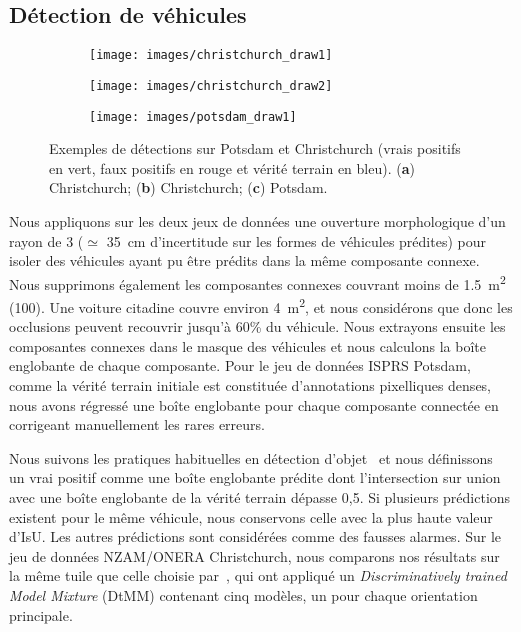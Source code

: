 \subsection{Détection de véhicules}
\begin{figure}[t]
\centering
	\begin{subfigure}{0.3\textwidth}
    	\texttt{[image: images/christchurch\_draw1]}
    	\caption{}
    \end{subfigure}
    \begin{subfigure}{0.3\textwidth}
    	\texttt{[image: images/christchurch\_draw2]}
    	\caption{}
    \end{subfigure}\begin{subfigure}{0.3\textwidth}
    	\texttt{[image: images/potsdam\_draw1]}
    	\caption{}
    \end{subfigure}\vspace{-12pt}
	\caption{Exemples de détections sur Potsdam et Christchurch (vrais positifs en vert, faux positifs en rouge et vérité terrain en bleu). (\textbf{a}) Christchurch; (\textbf{b}) Christchurch; (\textbf{c}) Potsdam.}
    \label{fig:detection_samples}
\end{figure}

Nous appliquons sur les deux jeux de données une ouverture morphologique d'un rayon de \SI{3}{\px} ($\simeq$ \SI{35}{\centi\meter} d'incertitude sur les formes de véhicules prédites) pour isoler des véhicules ayant pu être prédits dans la même composante connexe. Nous supprimons également les composantes connexes couvrant moins de \SI{1,5}{\meter\squared} (\SI{100}{\px}). Une voiture citadine couvre environ \SI{4}{\meter\squared}, et nous considérons que donc les occlusions peuvent recouvrir jusqu'à 60\% du véhicule. Nous extrayons ensuite les composantes connexes dans le masque des véhicules et nous calculons la boîte englobante de chaque composante. Pour le jeu de données \gls{ISPRS} Potsdam, comme la vérité terrain initiale est constituée d'annotations pixelliques denses, nous avons régressé une boîte englobante pour chaque composante connectée en corrigeant manuellement les rares erreurs.

Nous suivons les pratiques habituelles en détection d'objet~\cite{everingham_pascal_2014} et nous définissons un vrai positif comme une boîte englobante prédite dont l'intersection sur union avec une boîte englobante de la vérité terrain dépasse 0,5. Si plusieurs prédictions existent pour le même véhicule, nous conservons celle avec la plus haute valeur d'\gls{IsU}. Les autres prédictions sont considérées comme des fausses alarmes. Sur le jeu de données NZAM/ONERA Christchurch, nous comparons nos résultats sur la même tuile que celle choisie par~\citet{randrianarivo_contextual_2016}, qui ont appliqué un \emph{Discriminatively trained Model Mixture} (DtMM) contenant cinq modèles, un pour chaque orientation principale.

